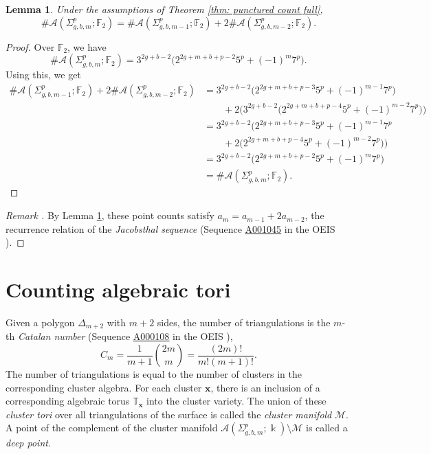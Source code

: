 \documentclass[reqno,12pt]{amsart}
\newtheorem{lemma}[thm]{Lemma}
\theoremstyle{definition}
\theoremstyle{remark}
\theoremstyle{remark}
\newenvironment{rem}{\refstepcounter{thm}\begin{proof}[Remark \emph{\thethm}]\renewcommand*{\qedsymbol}{\(\blacksquare\)}}{\end{proof}}
\numberwithin{equation}{section}
\newcommand{\seqnum}[1]{\href{https://oeis.org/#1}{\rm \underline{#1}}}
\begin{document}
\begin{lemma}\label{lemma: recurrence}
	Under the assumptions of Theorem \ref{thm: punctured count full},  
	\[ \#\mathcal{A}(\Sigma_{g,b,m}^p; \mathbb{F}_2) = \#\mathcal{A}(\Sigma_{g,b,m-1}^p; \mathbb{F}_2) + 2 \#\mathcal{A}(\Sigma_{g,b,m-2}^p; \mathbb{F}_2). \]
\end{lemma}
\begin{proof}
	Over $\mathbb{F}_2$, we have  
	\[ \#\mathcal{A}(\Sigma_{g,b,m}^p; \mathbb{F}_2) = 3^{2g+b-2} \big( 2^{2g+m+b+p-2} 5^p + (-1)^m 7^p \big). \]
	Using this, we get 
	\begin{align*}
		\#\mathcal{A}(\Sigma_{g,b,m-1}^p; \mathbb{F}_2) + 2 \#\mathcal{A}(\Sigma_{g,b,m-2}^p; \mathbb{F}_2) &= 3^{2g+b-2} \big( 2^{2g+m+b+p-3} 5^p + (-1)^{m-1} 7^p \big) \\ &\quad\quad + 2\big(3^{2g+b-2} \big( 2^{2g+m+b+p-4} 5^p + (-1)^{m-2} 7^p \big)\big) \\
		&= 3^{2g+b-2}\big( 2^{2g+m+b+p-3} 5^p + (-1)^{m-1} 7^p  \\ &\quad\quad  + 2\big(2^{2g+m+b+p-4} 5^p + (-1)^{m-2} 7^p\big) \big) \\
		&= 3^{2g+b-2}\big( 2^{2g+m+b+p-2} 5^p + (-1)^m 7^p \big) \\
		&= \#\mathcal{A}(\Sigma_{g,b,m}^p; \mathbb{F}_2).
	\end{align*}
	
\end{proof}

\begin{rem}
	By Lemma \ref{lemma: recurrence}, these point counts satisfy $ a_m = a_{m-1} + 2a_{m-2} $, the recurrence relation  of the \emph{Jacobsthal sequence} (Sequence \seqnum{A001045} in the OEIS \cite{oeis}).
\end{rem}


\section{Counting algebraic tori}\label{section: tori}

Given a polygon $\Delta_{m+2}$ with $m+2$ sides, the number of triangulations is the $m$-th \emph{Catalan number} (Sequence \seqnum{A000108} in the OEIS \cite{oeis}),  \[ C_m = \frac{1}{m+1}\binom{2m}{m} = \frac{(2m)!}{m!(m+1)!}. \]
The number of triangulations is equal to the number of clusters in the corresponding cluster algebra. For each cluster $\mathbf{x}$, there is an inclusion of a corresponding algebraic torus $\mathbb{T}_\mathbf{x}$ into the cluster variety. The union of these \emph{cluster tori} over all triangulations of the surface is called the \emph{cluster manifold} $\mathcal{M}$. A point of the complement of the cluster manifold $\mathcal{A}(\Sigma_{g,b,m}^p ; \Bbbk) \setminus \mathcal{M}$ is called a \emph{deep point}.
\end{document}
